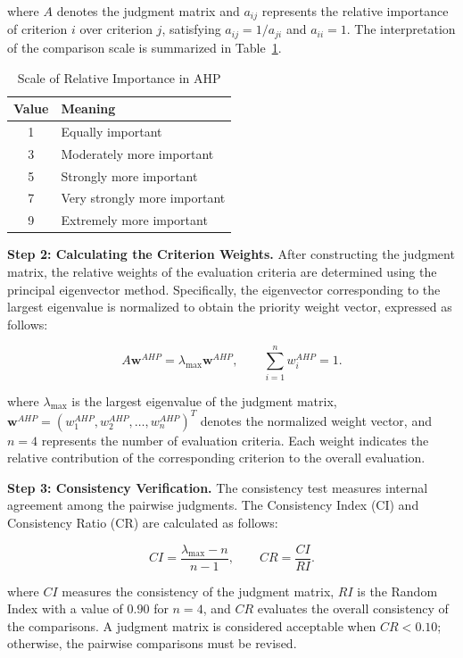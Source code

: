 \documentclass{mcmthesis}
\begin{document}
where $A$ denotes the judgment matrix and $a_{ij}$ represents the relative importance of criterion $i$ over criterion $j$, satisfying $a_{ij}=1/a_{ji}$ and $a_{ii}=1$. The interpretation of the comparison scale is summarized in Table~\ref{tab:ahp_scale}.

\begin{table}[htbp]
\centering
\caption{Scale of Relative Importance in AHP}
\label{tab:ahp_scale}
\begin{tabular}{cl}
\hline
\textbf{Value} & \textbf{Meaning} \\
\hline
1 & Equally important \\
3 & Moderately more important \\
5 & Strongly more important \\
7 & Very strongly more important \\
9 & Extremely more important \\
\hline
\end{tabular}
\end{table}

\noindent\textbf{Step 2: Calculating the Criterion Weights.}
After constructing the judgment matrix, the relative weights of the evaluation criteria are determined using the principal eigenvector method. Specifically, the eigenvector corresponding to the largest eigenvalue is normalized to obtain the priority weight vector, expressed as follows:

\begin{equation}
A\mathbf{w}^{AHP}
=
\lambda_{\max}\mathbf{w}^{AHP},
\qquad
\sum_{i=1}^{n}w_i^{AHP}=1.
\end{equation}

where $\lambda_{\max}$ is the largest eigenvalue of the judgment matrix, $\mathbf{w}^{AHP}=(w_1^{AHP},w_2^{AHP},\ldots,w_n^{AHP})^{T}$ denotes the normalized weight vector, and $n=4$ represents the number of evaluation criteria. Each weight indicates the relative contribution of the corresponding criterion to the overall evaluation.

\noindent\textbf{Step 3: Consistency Verification.}
The consistency test measures internal agreement among the pairwise judgments. The Consistency Index (CI) and Consistency Ratio (CR) are calculated as follows:

\begin{equation}
CI=\frac{\lambda_{\max}-n}{n-1},
\qquad
CR=\frac{CI}{RI}.
\end{equation}

where $CI$ measures the consistency of the judgment matrix, $RI$ is the Random Index with a value of $0.90$ for $n=4$, and $CR$ evaluates the overall consistency of the comparisons. A judgment matrix is considered acceptable when $CR<0.10$; otherwise, the pairwise comparisons must be revised.
\end{document}
